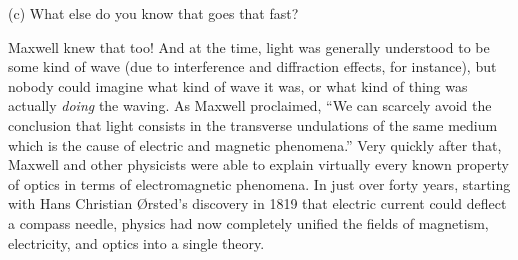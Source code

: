 (c) What else do you know that goes that fast?
\vspace{0.5in}

Maxwell knew that too!  And at the time, light was generally understood to be some kind of wave (due to interference and diffraction effects, for instance), but nobody could imagine what kind of wave it was, or what kind of thing was actually \textit{doing} the waving.  As Maxwell proclaimed, ``We can scarcely avoid the conclusion that light consists in the transverse undulations of the same medium which is the cause of electric and magnetic phenomena.''  Very quickly after that, Maxwell and other physicists were able to explain virtually every known property of optics in terms of electromagnetic phenomena.  In just over forty years, starting with  Hans Christian \O rsted's discovery in 1819 that electric current could deflect a compass needle, physics had now completely unified the fields of magnetism, electricity, and optics into a single theory.  





